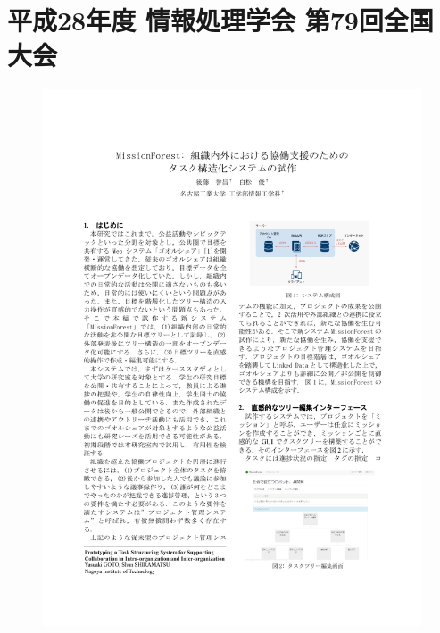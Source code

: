 \chapter{平成28年度 情報処理学会 第79回全国大会}
\begin{figure}[ht]
    \begin{center}
        \includegraphics[width=1.0\linewidth]{assets/pdf/ipsj2017_1.pdf}
    \end{center}
\end{figure}
